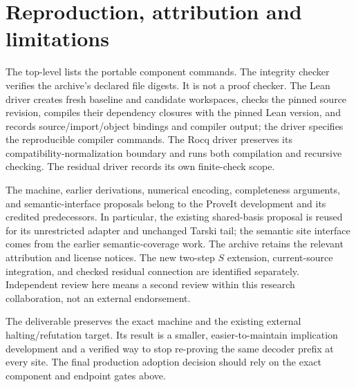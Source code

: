 \documentclass[11pt,letterpaper]{article}
\newcommand{\code}[1]{\texttt{\small\detokenize{#1}}}
\begin{document}
\section{Reproduction, attribution and limitations}

The top-level \code{README.md} lists the portable component commands. The
integrity checker verifies the archive's declared file digests. It is not a
proof checker. The Lean driver creates fresh baseline and candidate workspaces,
checks the pinned source revision, compiles their dependency closures with the
pinned Lean version, and records source/import/object bindings and compiler
output; the driver specifies the reproducible compiler commands.
The Rocq driver preserves its compatibility-normalization
boundary and runs both compilation and recursive checking. The residual driver
records its own finite-check scope.

The machine, earlier derivations, numerical encoding, completeness arguments,
and semantic-interface proposals belong to the ProveIt development and its
credited predecessors. In particular, the existing shared-basis proposal is
reused for its unrestricted adapter and unchanged Tarski tail; the semantic
site interface comes from the earlier semantic-coverage work. The archive
retains the relevant attribution and license notices. The new two-step $S$
extension, current-source integration, and checked residual connection are
identified separately. Independent review here means a second review within
this research collaboration, not an external endorsement.

The deliverable preserves the exact machine and the existing external
halting/refutation target. Its result is a smaller, easier-to-maintain implication
development and a verified way to stop re-proving the same decoder prefix at
every site. The final
production adoption decision should rely on the exact component and endpoint
gates above.
\end{document}
